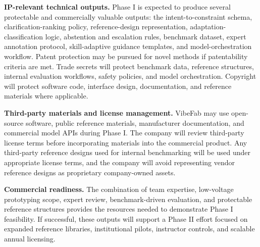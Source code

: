 \textbf{IP-relevant technical outputs.} Phase I is expected to produce several protectable and commercially valuable outputs: the intent-to-constraint schema, clarification-ranking policy, reference-design representation, adaptation-classification logic, abstention and escalation rules, benchmark dataset, expert annotation protocol, skill-adaptive guidance templates, and model-orchestration workflow. Patent protection may be pursued for novel methods if patentability criteria are met. Trade secrets will protect benchmark data, reference structures, internal evaluation workflows, safety policies, and model orchestration. Copyright will protect software code, interface design, documentation, and reference materials where applicable.

\textbf{Third-party materials and license management.} VibeFab may use open-source software, public reference materials, manufacturer documentation, and commercial model APIs during Phase I. The company will review third-party license terms before incorporating materials into the commercial product. Any third-party reference designs used for internal benchmarking will be used under appropriate license terms, and the company will avoid representing vendor reference designs as proprietary company-owned assets.

\textbf{Commercial readiness.} The combination of team expertise, low-voltage prototyping scope, expert review, benchmark-driven evaluation, and protectable reference structures provides the resources needed to demonstrate Phase I feasibility. If successful, these outputs will support a Phase II effort focused on expanded reference libraries, institutional pilots, instructor controls, and scalable annual licensing.

